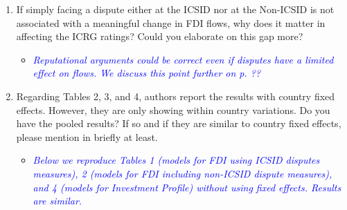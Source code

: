 \begin{enumerate}
	\item If simply facing a dispute either at the ICSID nor at the Non-ICSID is not associated with a meaningful change in FDI flows, why does it matter in affecting the ICRG ratings? Could you elaborate on this gap more?	
	\begin{itemize}
		\item \textcolor{blue}{ \emph{
		Reputational arguments could be correct even if disputes have a limited effect on flows. We discuss this point further on p. ??
		}}
	\end{itemize}
	\item Regarding Tables 2, 3, and 4, authors report the results with country fixed effects. However, they are only showing within country variations. Do you have the pooled results? If so and if they are similar to country fixed effects, please mention in briefly at least.
	\begin{itemize}
		\item \textcolor{blue}{ \emph{ Below we reproduce Tables 1 (models for FDI using ICSID disputes measures), 2 (models for FDI including non-ICSID dispute measures), and 4 (models for Investment Profile) without using fixed effects. Results are similar.  }}


\end{itemize}
\end{enumerate}
